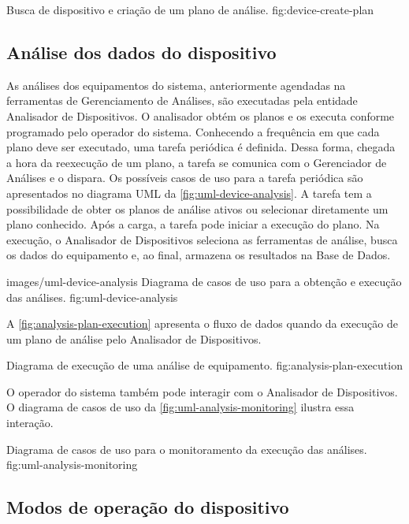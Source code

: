   {Busca de dispositivo e criação de um plano de análise.}
  {fig:device-create-plan}


\subsection{Análise dos dados do dispositivo}

As análises dos equipamentos do sistema, anteriormente agendadas na ferramentas de Gerenciamento de
Análises, são executadas pela entidade Analisador de Dispositivos. O analisador obtém os planos e os
executa conforme programado pelo operador do sistema. Conhecendo a frequência em que cada plano deve
ser executado, uma tarefa periódica é definida. Dessa forma, chegada a hora da reexecução de um
plano, a tarefa se comunica com o Gerenciador de Análises e o dispara. Os possíveis casos de uso
para a tarefa periódica são apresentados no diagrama \gls{UML} da \cref{fig:uml-device-analysis}. A
tarefa tem a possibilidade de obter os planos de análise ativos ou selecionar diretamente um plano
conhecido. Após a carga, a tarefa pode iniciar a execução do plano. Na execução, o Analisador de
Dispositivos seleciona as ferramentas de análise, busca os dados do equipamento e, ao final,
armazena os resultados na Base de Dados.

  {images/uml-device-analysis}
  {Diagrama de casos de uso para a obtenção e execução das análises.}
  {fig:uml-device-analysis}

A \cref{fig:analysis-plan-execution} apresenta o fluxo de dados quando da execução de um plano de
análise pelo Analisador de Dispositivos.

  {Diagrama de execução de uma análise de equipamento.}
  {fig:analysis-plan-execution}

O operador do sistema também pode interagir com o Analisador de Dispositivos. O diagrama de casos de
uso da \cref{fig:uml-analysis-monitoring} ilustra essa interação.

  {Diagrama de casos de uso para o monitoramento da execução das análises.}
  {fig:uml-analysis-monitoring}


\subsection{Modos de operação do dispositivo}

